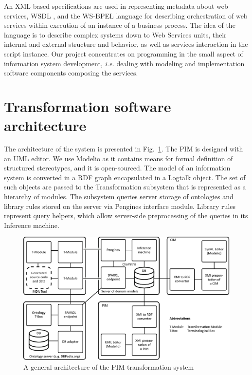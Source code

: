\documentclass[runningheads]{llncs}
\begin{document}
An XML based specifications are used in representing metadata about web services, WSDL \cite{wsdl}, and the WS-BPEL language \cite{wsbpel} for describing orchestration of web services within execution of an instance of a business process.  The idea of the language is to describe complex systems down to Web Services units, their internal and external structure and behavior, as well as services interaction in the script instance.  Our project concentrates on programming in the small aspect of information system development, \emph{i.e.} dealing with modeling and implementation software components composing the services.

\section{Transformation software architecture}
\label{sec:arch}

The architecture of the system is presented in Fig.~\ref{fig:arch}.  The PIM is designed with an UML editor.  We use Modelio \cite{modelio} as it contains means for formal definition of structured stereotypes, and it is open-sourced.  The model of an information system is converted in a RDF graph encapsulated in a Logtalk object.  The set of such objects are passed to the Transformation subsystem that is represented as a hierarchy of modules.  The subsystem queries server storage of ontologies and library rules stored on the server via Pengines interface module.  Library rules represent query helpers, which allow server-side preprocessing of the queries in its Inference machine.

\begin{figure}[t]
  \centering
  \includegraphics[width=1\linewidth]{architecture-mda-lod-ext.pdf}
  \caption{A general architecture of the PIM transformation system}
  \label{fig:arch}
\end{figure}
\end{document}
